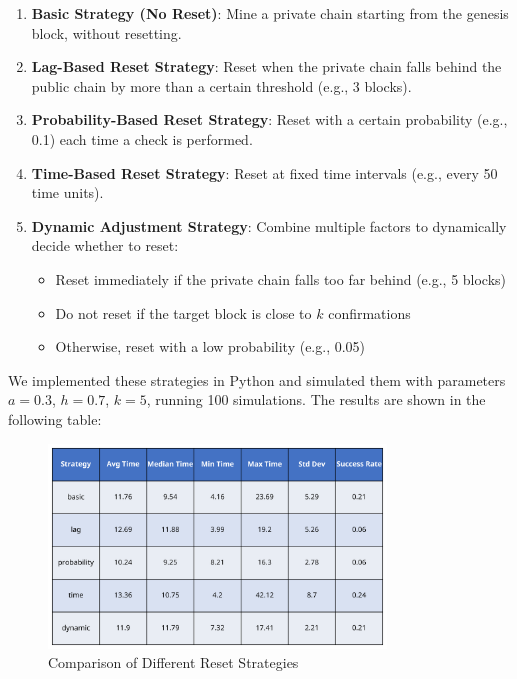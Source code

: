\documentclass[12pt,a4paper]{article}
\begin{document}
\begin{enumerate}
    \item \textbf{Basic Strategy (No Reset)}: Mine a private chain starting from the genesis block, without resetting.
    \item \textbf{Lag-Based Reset Strategy}: Reset when the private chain falls behind the public chain by more than a certain threshold (e.g., 3 blocks).
    \item \textbf{Probability-Based Reset Strategy}: Reset with a certain probability (e.g., 0.1) each time a check is performed.
    \item \textbf{Time-Based Reset Strategy}: Reset at fixed time intervals (e.g., every 50 time units).
    \item \textbf{Dynamic Adjustment Strategy}: Combine multiple factors to dynamically decide whether to reset:
        \begin{itemize}
            \item Reset immediately if the private chain falls too far behind (e.g., 5 blocks)
            \item Do not reset if the target block is close to $k$ confirmations
            \item Otherwise, reset with a low probability (e.g., 0.05)
        \end{itemize}
\end{enumerate}

We implemented these strategies in Python and simulated them with parameters $a = 0.3$, $h = 0.7$, $k = 5$, running 100 simulations. The results are shown in the following table:

\begin{figure}[H] %
    \centering
    \includegraphics[width=0.8\textwidth]{images/reset_strategy_table.png}
    \caption{Comparison of Different Reset Strategies}
\end{figure}
\end{document}
